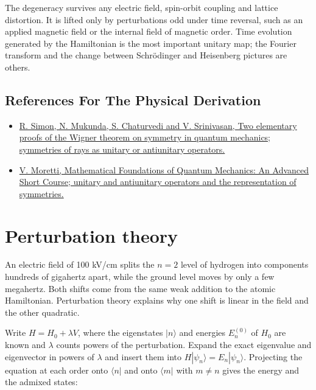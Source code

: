\documentclass[11pt,oneside]{book}
\begin{document}
The degeneracy survives any electric field, spin-orbit coupling and lattice distortion. It is lifted only by perturbations odd under time reversal, such as an applied magnetic field or the internal field of magnetic order. Time evolution generated by the Hamiltonian is the most important unitary map; the Fourier transform and the change between Schrödinger and Heisenberg pictures are others.

\subsection*{References For The Physical Derivation}
\begin{itemize}
\item \href{https://arxiv.org/abs/0808.0779}{R. Simon, N. Mukunda, S. Chaturvedi and V. Srinivasan, Two elementary proofs of the Wigner theorem on symmetry in quantum mechanics; symmetries of rays as unitary or antiunitary operators.}
\item \href{https://arxiv.org/abs/1508.06951}{V. Moretti, Mathematical Foundations of Quantum Mechanics: An Advanced Short Course; unitary and antiunitary operators and the representation of symmetries.}
\end{itemize}





\clearpage

\section{Perturbation theory}

\label{topic:perturbation-theory}

An electric field of 100 kV/cm splits the \(n=2\) level of hydrogen into components hundreds of gigahertz apart, while the ground level moves by only a few megahertz. Both shifts come from the same weak addition to the atomic Hamiltonian. Perturbation theory explains why one shift is linear in the field and the other quadratic.

Write \(H=H_0+\lambda V\), where the eigenstates \(|n\rangle\) and energies \(E_n^{(0)}\) of \(H_0\) are known and \(\lambda\) counts powers of the perturbation. Expand the exact eigenvalue and eigenvector in powers of \(\lambda\) and insert them into \(H|\psi_n\rangle=E_n|\psi_n\rangle\). Projecting the equation at each order onto \(\langle n|\) and onto \(\langle m|\) with \(m\neq n\) gives the energy and the admixed states:
\end{document}
